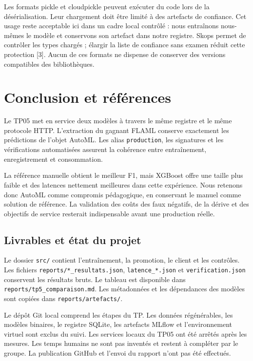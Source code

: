 \documentclass[11pt,a4paper]{article}
\begin{document}
Les formats pickle et cloudpickle peuvent exécuter du code lors de la désérialisation. Leur chargement doit être limité à des artefacts de confiance. Cet usage reste acceptable ici dans un cadre local contrôlé : nous entraînons nous-mêmes le modèle et conservons son artefact dans notre registre. Skops permet de contrôler les types chargés ; élargir la liste de confiance sans examen réduit cette protection [3]. Aucun de ces formats ne dispense de conserver des versions compatibles des bibliothèques.

\clearpage
\section{Conclusion et références}
Le TP05 met en service deux modèles à travers le même registre et le même protocole HTTP. L'extraction du gagnant FLAML conserve exactement les prédictions de l'objet AutoML. Les alias \texttt{production}, les signatures et les vérifications automatisées assurent la cohérence entre entraînement, enregistrement et consommation.

La référence manuelle obtient le meilleur F1, mais XGBoost offre une taille plus faible et des latences nettement meilleures dans cette expérience. Nous retenons donc AutoML comme compromis pédagogique, en conservant le manuel comme solution de référence. La validation des coûts des faux négatifs, de la dérive et des objectifs de service resterait indispensable avant une production réelle.

\subsection*{Livrables et état du projet}
Le dossier \texttt{src/} contient l'entraînement, la promotion, le client et les contrôles. Les fichiers \texttt{reports/*\_resultats.json}, \texttt{latence\_*.json} et \texttt{verification.json} conservent les résultats bruts. Le tableau est disponible dans \texttt{reports/tp5\_comparaison.md}. Les métadonnées et les dépendances des modèles sont copiées dans \texttt{reports/artefacts/}.

Le dépôt Git local comprend les étapes du TP. Les données régénérables, les modèles binaires, le registre SQLite, les artefacts MLflow et l'environnement virtuel sont exclus du suivi. Les services locaux du TP05 ont été arrêtés après les mesures. Les temps humains ne sont pas inventés et restent à compléter par le groupe. La publication GitHub et l'envoi du rapport n'ont pas été effectués.
\end{document}
